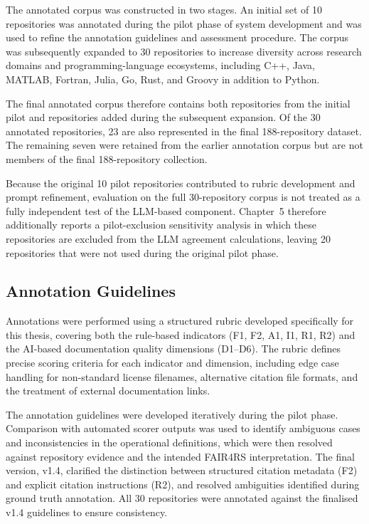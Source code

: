 The annotated corpus was constructed in two stages. An initial set
of 10 repositories was annotated during the pilot phase of system
development and was used to refine the annotation guidelines and
assessment procedure. The corpus was subsequently expanded to
30 repositories to increase diversity across research domains and
programming-language ecosystems, including C++, Java, MATLAB,
Fortran, Julia, Go, Rust, and Groovy in addition to Python.

The final annotated corpus therefore contains both repositories from
the initial pilot and repositories added during the subsequent
expansion. Of the 30 annotated repositories, 23 are also represented
in the final 188-repository dataset. The remaining seven were retained
from the earlier annotation corpus but are not members of the final
188-repository collection.

Because the original 10 pilot repositories contributed to rubric
development and prompt refinement, evaluation on the full
30-repository corpus is not treated as a fully independent test of
the LLM-based component. Chapter~5 therefore additionally reports a
pilot-exclusion sensitivity analysis in which these repositories are
excluded from the LLM agreement calculations, leaving 20 repositories
that were not used during the original pilot phase.
\subsection{Annotation Guidelines}

Annotations were performed using a structured rubric developed 
specifically for this thesis, covering both the rule-based 
indicators (F1, F2, A1, I1, R1, R2) and the AI-based documentation 
quality dimensions (D1--D6). The rubric defines precise scoring 
criteria for each indicator and dimension, including edge case 
handling for non-standard license filenames, alternative citation 
file formats, and the treatment of external documentation links.

The annotation guidelines were developed iteratively during the
pilot phase. Comparison with automated scorer outputs was used to
identify ambiguous cases and inconsistencies in the operational
definitions, which were then resolved against repository evidence and
the intended FAIR4RS interpretation. The final version, v1.4, clarified the distinction between 
structured citation metadata (F2) and explicit citation instructions 
(R2), and resolved ambiguities identified during ground truth 
annotation. All 30 repositories were annotated against the 
finalised v1.4 guidelines to ensure consistency.

